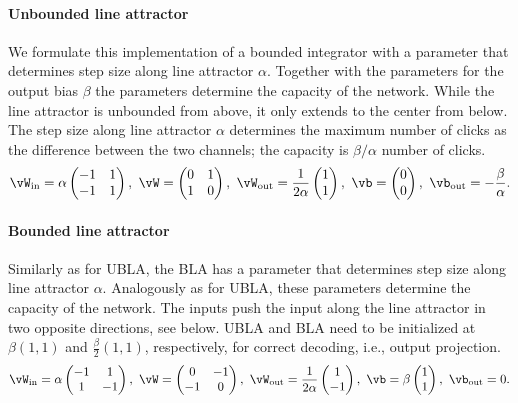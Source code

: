 \documentclass{article} %
\newcounter{ct}
\newcommand{\win}{\vW_{\text{in}}}
\newcommand{\wout}{\vW_{\text{out}}}
\newcommand{\bout}{\vb_{\text{out}}}
\theoremstyle{definition}
\theoremstyle{remark}
\begin{document}
\paragraph{Unbounded line attractor}
We formulate this implementation of a bounded integrator with a parameter that determines step size along line attractor $\alpha$. Together with the parameters for the output bias $\beta$ the parameters determine the capacity of the network. While the line attractor is unbounded from above, it only extends to the center from below.  The step size along line attractor $\alpha$ determines the maximum number of clicks as the difference between the two channels; the capacity is $\beta/\alpha$ number of clicks.
\label{sec:ubla}
\begin{equation}\label{eq:ubla}
\win = \alpha
\begin{pmatrix}
-1  &  1 \\
-1  &  1
\end{pmatrix}, \
\vW = 
\begin{pmatrix}
0  &  1 \\
1  &  0
\end{pmatrix}, \
\wout = \frac{1}{2\alpha}
\begin{pmatrix}
1  \\  1 
\end{pmatrix}, \
\vb = 
\begin{pmatrix}
0  \\  0
\end{pmatrix}, \
\bout = -\frac{\beta}{\alpha}.
\end{equation}



\paragraph{Bounded line attractor}\label{sec:bla}
Similarly as for UBLA, the BLA has a parameter that determines step size along line attractor $\alpha$. Analogously as for UBLA, these parameters determine the capacity of the network.
The inputs push the input along the line attractor in two opposite directions, see below. UBLA and BLA need to be initialized at $\beta(1,1)$ and $\tfrac{\beta}{2}(1,1)$, respectively, for correct decoding, i.e., output projection.
\begin{equation}\label{eq:bla}
\win = \alpha
\begin{pmatrix}
-1  &  1 \\
1  &  -1
\end{pmatrix}, \
\vW = 
\begin{pmatrix}
0  &  -1 \\
-1  &  0
\end{pmatrix}, \
\wout = \frac{1}{2\alpha}
\begin{pmatrix}
1  \\  -1 
\end{pmatrix}, \
\vb = \beta
\begin{pmatrix}
1 \\  1 
\end{pmatrix}, \
\bout = 0.
\end{equation}
\end{document}
